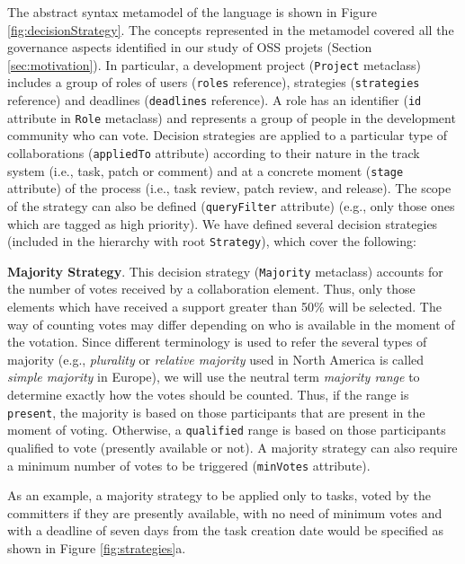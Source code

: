 The abstract syntax metamodel of the language is shown in Figure \ref{fig:decisionStrategy}. The concepts represented in the metamodel covered all the governance aspects identified in our study of OSS projets (Section \ref{sec:motivation}). In particular, a development project (\texttt{Project} metaclass) includes a group of roles of users (\texttt{roles} reference), strategies (\texttt{strategies} reference) and deadlines (\texttt{deadlines} reference). A role has an identifier (\texttt{id} attribute in \texttt{Role} metaclass) and represents a group of people in the development community who can vote. Decision strategies are applied to a particular type of collaborations (\texttt{appliedTo} attribute) according to their nature in the track system (i.e., task, patch or comment) and at a concrete moment (\texttt{stage} attribute) of the process (i.e., task review, patch review, and release). The scope of the strategy can also be defined (\texttt{queryFilter} attribute) (e.g., only those ones which are tagged as high priority). We have defined several decision strategies (included in the hierarchy with root \texttt{Strategy}), which cover the following:

\vspace{0.15em}
\noindent \textbf{Majority Strategy}. This decision strategy (\texttt{Majority} metaclass) accounts for the number of votes received by a collaboration element. Thus, only those elements which have received a support greater than 50\% will be selected. The way of counting votes may differ depending on who is available in the moment of the votation. Since different terminology is used to refer the several types of majority (e.g., \emph{plurality} or \emph{relative majority} used in North America is called \emph{simple majority} in Europe), we will use the neutral term \emph{majority range} to determine exactly how the votes should be counted. Thus, if the range is \texttt{present}, the majority is based on those participants that are present in the moment of voting. Otherwise, a \texttt{qualified} range is based on those participants qualified to vote (presently available or not). A majority strategy can also require a minimum number of votes to be triggered (\texttt{minVotes} attribute). 
    
    As an example, a majority strategy to be applied only to tasks, voted by the committers if they are presently available,  with no need of minimum votes and with a deadline of seven days from the task creation date would be specified as shown in Figure \ref{fig:strategies}a.

